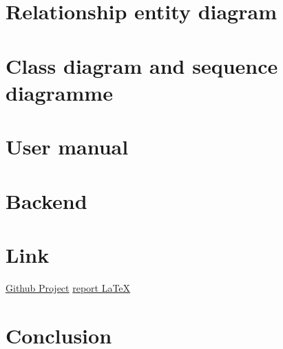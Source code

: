 \documentclass{article}
\begin{document}
\section{Relationship entity diagram}

\section{Class diagram and sequence diagramme}

\section{User manual}

\section{Backend}

\section{Link}
\href{https://github.com/I42I/Kitbox_app}{Github Project}
\href{https://github.com/PierreLouis-23317/Software2_report/settings/access}{report LaTeX}


\section{Conclusion}
\end{document}
